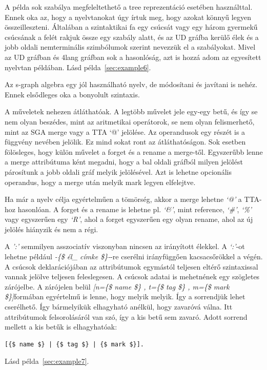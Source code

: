A példa sok szabálya megfeleltethető a tree reprezentáció esetében használttal. Ennek oka az, hogy a nyelvtanokat úgy írtuk meg, hogy azokat könnyű legyen összeilleszteni. Általában a szintaktikai fa egy csúcsát vagy egy három gyermekű csúcsának a felét rakjuk össze egy szabály alatt, és az UD gráfba kerülő élek és a jobb oldali nemterminális szimbólumok szerint nevezzük el a szabályokat. Mivel az UD gráfban és 4lang gráfban sok a hasonlóság, azt is hozzá adom az egyesített nyelvtan példában. Lásd példa~\ref{sec:example6}.

Az s-graph algebra egy jól használható nyelv, de módosítani és javítani is nehéz. Ennek elsődleges oka a bonyolult szintaxis.

A műveletek nehezen átláthatóak. A legtöbb művelet jele egy-egy betű, és így se nem olyan beszédes, mint az aritmetikai operátorok, se nem olyan felismerhető, mint az SGA merge vagy a TTA ‘@’ jelölése. Az operandusok egy részét is a függvény nevében jelölik.  Ez mind sokat ront az átláthatóságon. Sok esetben fölösleges, hogy külön művelet a forget és a rename a merge-től. Egyszerűbb lenne a merge attribútuma ként megadni, hogy a bal oldali gráfból milyen jelölést párosítunk a jobb oldali gráf melyik jelölésével. Azt is lehetne opcionális operandus, hogy a merge után melyik mark legyen elfelejtve.

Ha már a nyelv célja egyértelműen a tömörség, akkor a merge lehetne \textit{‘@’} a TTA-hoz hasonlóan. A forget és a rename is lehetne pl. \textit{‘\&’}, mint reference, \textit{‘\#’}, \textit{‘\%’} vagy egyszerűen egy \textit{‘R’}, ahol a forget egyszerűen egy olyan rename, ahol az új jelölés hiányzik és nem a régi.

A \textit{':'} semmilyen asszociatív viszonyban nincsen az irányított élekkel. A \textit{‘:’}-ot lehetne például \textit{-\{\$ él\_ címke \$\}-}-re cserélni irányfüggően kacsacsőrökkel a végén.
A csúcsok deklarációjában az attribútumok egymástól teljesen eltérő szintaxissal vannak jelölve teljesen feleslegesen. A csúcsok adatai is mehetnének egy szögletes zárójelbe. A zárójelen belül \textit{[n=\{\$ name \$\} , t=\{\$ tag \$\} , m=\{\$ mark \$\}]}formában egyértelmű is lenne, hogy melyik melyik. Így a sorrendjük lehet cserélhető. Így bármelyikük elhagyható anélkül, hogy zavaróvá válna. Itt attribútumok felsorolásáról van szó, így a kis betű sem zavaró. Adott sorrend mellett a kis betűk is elhagyhatóak:
\begin{verbatim}
[{$ name $} | {$ tag $} | {$ mark $}].
\end{verbatim}
 Lásd példa~\ref{sec:example7}.

